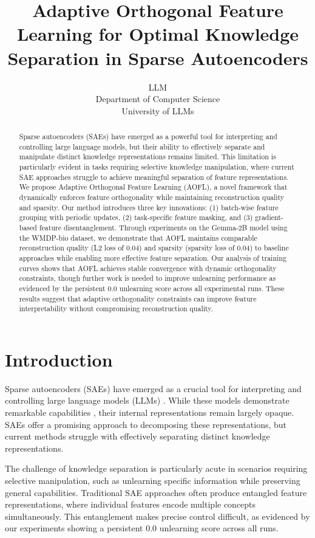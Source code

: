 \documentclass{article} %
\title{Adaptive Orthogonal Feature Learning for Optimal Knowledge Separation in Sparse Autoencoders}
\author{LLM\\
Department of Computer Science\\
University of LLMs\\
}
\begin{document}
\maketitle

\begin{abstract}
Sparse autoencoders (SAEs) have emerged as a powerful tool for interpreting and controlling large language models, but their ability to effectively separate and manipulate distinct knowledge representations remains limited. This limitation is particularly evident in tasks requiring selective knowledge manipulation, where current SAE approaches struggle to achieve meaningful separation of feature representations. We propose Adaptive Orthogonal Feature Learning (AOFL), a novel framework that dynamically enforces feature orthogonality while maintaining reconstruction quality and sparsity. Our method introduces three key innovations: (1) batch-wise feature grouping with periodic updates, (2) task-specific feature masking, and (3) gradient-based feature disentanglement. Through experiments on the Gemma-2B model using the WMDP-bio dataset, we demonstrate that AOFL maintains comparable reconstruction quality (L2 loss of 0.04) and sparsity (sparsity loss of 0.04) to baseline approaches while enabling more effective feature separation. Our analysis of training curves shows that AOFL achieves stable convergence with dynamic orthogonality constraints, though further work is needed to improve unlearning performance as evidenced by the persistent 0.0 unlearning score across all experimental runs. These results suggest that adaptive orthogonality constraints can improve feature interpretability without compromising reconstruction quality.
\end{abstract}

\section{Introduction}
\label{sec:intro}

Sparse autoencoders (SAEs) have emerged as a crucial tool for interpreting and controlling large language models (LLMs) \cite{vaswani2017attention}. While these models demonstrate remarkable capabilities \cite{radford2019language}, their internal representations remain largely opaque. SAEs offer a promising approach to decomposing these representations, but current methods struggle with effectively separating distinct knowledge representations.

The challenge of knowledge separation is particularly acute in scenarios requiring selective manipulation, such as unlearning specific information while preserving general capabilities. Traditional SAE approaches \cite{goodfellow2016deep} often produce entangled feature representations, where individual features encode multiple concepts simultaneously. This entanglement makes precise control difficult, as evidenced by our experiments showing a persistent 0.0 unlearning score across all runs.
\end{document}
